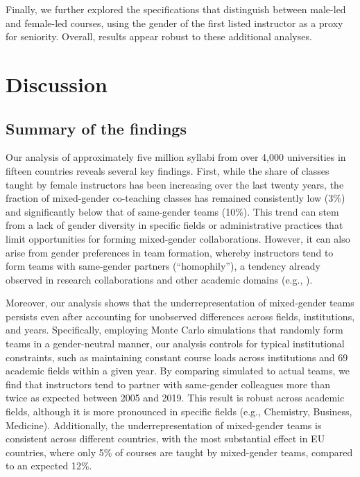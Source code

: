 \documentclass[
  12pt,
]{article}
\let\oldsection\section
\renewcommand{\section}{\clearpage\oldsection}
\begin{document}
Finally, we further explored the specifications that distinguish between male-led and female-led courses, using the gender of the first listed instructor as a proxy for seniority. Overall, results appear robust to these additional analyses.

\section{Discussion}\label{discussion}

\subsection{Summary of the findings}\label{summary-of-the-findings}

Our analysis of approximately five million syllabi from over 4,000 universities in fifteen countries reveals several key findings. First, while the share of classes taught by female instructors has been increasing over the last twenty years, the fraction of mixed-gender co-teaching classes has remained consistently low (3\%) and significantly below that of same-gender teams (10\%). This trend can stem from a lack of gender diversity in specific fields or administrative practices that limit opportunities for forming mixed-gender collaborations. However, it can also arise from gender preferences in team formation, whereby instructors tend to form teams with same-gender partners (``homophily''), a tendency already observed in research collaborations and other academic domains (e.g., ).

Moreover, our analysis shows that the underrepresentation of mixed-gender teams persists even after accounting for unobserved differences across fields, institutions, and years. Specifically, employing Monte Carlo simulations that randomly form teams in a gender-neutral manner, our analysis controls for typical institutional constraints, such as maintaining constant course loads across institutions and 69 academic fields within a given year. By comparing simulated to actual teams, we find that instructors tend to partner with same-gender colleagues more than twice as expected between 2005 and 2019. This result is robust across academic fields, although it is more pronounced in specific fields (e.g., Chemistry, Business, Medicine). Additionally, the underrepresentation of mixed-gender teams is consistent across different countries, with the most substantial effect in EU countries, where only 5\% of courses are taught by mixed-gender teams, compared to an expected 12\%.
\end{document}
